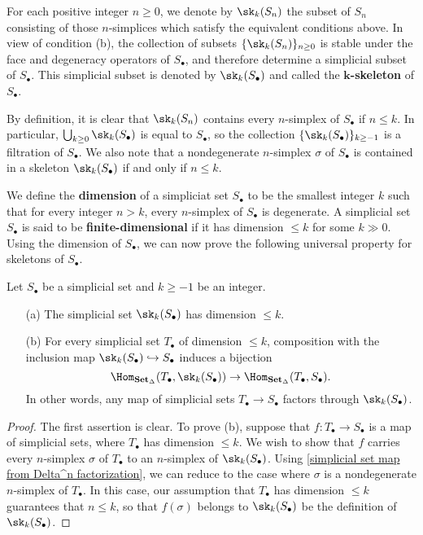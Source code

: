 For each positive integer $n\geq 0$, we denote by $\sk_k(S_n)$ the subset of $S_n$ consisting of those $n$-simplices which satisfy the equivalent conditions above. In view of condition (b), the collection of subsets $\{\sk_k(S_n)\}_{n\geq 0}$ is stable under the face and degeneracy operators of $S_\bullet$, and therefore determine a simplicial subset of $S_\bullet$. This simplicial subset is denoted by $\sk_k(S_\bullet)$ and called the \textbf{$\bm{k}$-skeleton} of $S_\bullet$.\par
By definition, it is clear that $\sk_k(S_n)$ contains every $n$-simplex of $S_\bullet$ if $n\leq k$. In particular, $\bigcup_{k\geq 0}\sk_k(S_\bullet)$ is equal to $S_\bullet$, so the collection $\{\sk_k(S_\bullet)\}_{k\geq-1}$ is a filtration of $S_\bullet$. We also note that a nondegenerate $n$-simplex $\sigma$ of $S_\bullet$ is contained in a skeleton $\sk_k(S_\bullet)$ if and only if $n\leq k$.\par
We define the \textbf{dimension} of a simpliciat set $S_\bullet$ to be the smallest integer $k$ such that for every integer $n>k$, every $n$-simplex of $S_\bullet$ is degenerate. A simplicial set $S_\bullet$ is said to be \textbf{finite-dimensional} if it has dimension $\leq k$ for some $k\gg 0$. Using the dimension of $S_\bullet$, we can now prove the following universal property for skeletons of $S_\bullet$.
\begin{proposition}\label{simplicial set skeleton universal prop}
Let $S_\bullet$ be a simplicial set and $k\geq -1$ be an integer.
\begin{itemize}
\item[(a)] The simplicial set $\sk_k(S_\bullet)$ has dimension $\leq k$.
\item[(b)] For every simplicial set $T_\bullet$ of dimension $\leq k$, composition with the inclusion map $\sk_k(S_\bullet)\hookrightarrow S_\bullet$ induces a bijection
\[\Hom_{\mathbf{Set}_\Delta}(T_\bullet,\sk_k(S_\bullet))\to\Hom_{\mathbf{Set}_\Delta}(T_\bullet,S_\bullet).\]
In other words, any map of simplicial sets $T_\bullet\to S_\bullet$ factors through $\sk_k(S_\bullet)$.
\end{itemize}
\end{proposition}
\begin{proof}
The first assertion is clear. To prove (b), suppose that $f:T_\bullet\to S_\bullet$ is a map of simplicial sets, where $T_\bullet$ has dimension $\leq k$. We wish to show that $f$ carries every $n$-simplex $\sigma$ of $T_\bullet$ to an $n$-simplex of $\sk_k(S_\bullet)$. Using \cref{simplicial set map from Delta^n factorization}, we can reduce to the case where $\sigma$ is a nondegenerate $n$-simplex of $T_\bullet$. In this case, our assumption that $T_\bullet$ has dimension $\leq k$ guarantees that $n\leq k$, so that $f(\sigma)$ belongs to $\sk_k(S_\bullet)$ be the definition of $\sk_k(S_\bullet)$.
\end{proof}
